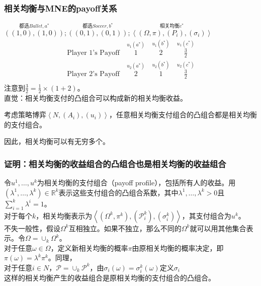 \documentclass{beamer}
\begin{document}
\begin{frame}[label = MNE_and_correlated_equilibrium_payoff]
	\frametitle{相关均衡与MNE的payoff关系}
	$\overset{\text{都选}Ballet,a^{*}}{\left(\left(1,0\right),\left(1,0\right)\right)}; \overset{\text{都选}Soccer,b^{*}}{\left(\left(0,1\right),\left(0,1\right)\right)}; \overset{\text{相关均衡}c^{*}}{\left\langle \left( \Omega,\pi\right) ,\left( P_{i}\right) ,\left( \sigma_{i}\right) \right\rangle}$
	\begin{equation*}
		\begin{aligned}
			\text{Player 1's Payoff}& \ \overset{u_{1}\left(a^{*}\right)}{1} &\ \overset{u_{1}\left(b^{*}\right)}{2}
			&\ \overset{u_{1}\left(c^{*}\right)}{\frac{3}{2}}\\
			\text{Player 2's Payoff}& \ \overset{u_{2}\left(a^{*}\right)}{2} &\ \overset{u_{2}\left(b^{*}\right)}{1}
			&\ \overset{u_{2}\left(c^{*}\right)}{\frac{3}{2}}\\
		\end{aligned}
	\end{equation*}
	注意到$\frac{3}{2}=\frac{1}{2}\times \left(1+2\right)$。\\
	直觉：相关均衡支付的凸组合可以构成新的相关均衡收益。\\
	\begin{theorem}
		考虑策略博弈$\left\langle N,\left(A_{i}\right),\left(u_{i}\right)\right\rangle$，任意相关均衡支付组合的凸组合都是相关均衡的支付组合。
	\end{theorem}
	因此，相关均衡可以有无穷多个。
\end{frame}


\begin{frame}[label = proof_MNE_and_correlated_equilibrium_payoff]
	\frametitle{证明：相关均衡的收益组合的凸组合也是相关均衡的收益组合}
    令$u^{1}, \dots, u^{k}$为相关均衡的支付组合（payoff profile），包括所有人的收益。用$\left(\lambda^{1}, \dots, \lambda^{k}\right) \in \mathbb{R}^k$表示这些支付组合的凸组合系数，其中$\lambda^{1}, \dots, \lambda^{k} > 0$且$\sum_{i=1}^{k} \lambda^{i} = 1$。\\
    对于每个$k$，相关均衡表示为$\left\langle \left(\Omega^{k},\pi^{k}\right),\left(\mathcal{P}_{i}^{k}\right),\left(\sigma_{i}^{k}\right)\right\rangle$，其支付组合为$u^{k}$。\\
    不失一般性，假设$\Omega^{k}$互相独立。如果不独立，那么不同的$\Omega^{k}$就可以用其他集合表示。令$\Omega = \cup_{k}\Omega^{k}$。\\
    对于任意$\omega\in\Omega$，定义新相关均衡的概率$\pi$由原相关均衡的概率决定，即$\pi\left(\omega\right)=\lambda^{k}\pi^{k}$。同理，\\
    对于任意$i\in N$，$\mathcal{P} = \cup_{k}\mathcal{P}^{k}$，由$\sigma_{i}\left(\omega\right)=\sigma_{i}^{k}\left(\omega\right)$定义$\sigma_{i}$\\
    这样的相关均衡产生的收益组合是原相关均衡的支付组合的凸组合。
\end{frame}
\end{document}
